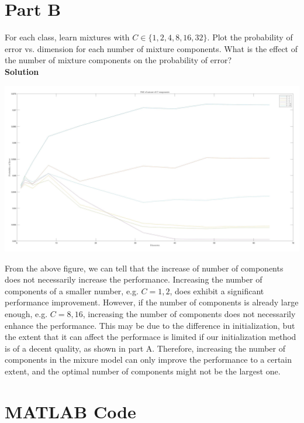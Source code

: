 \documentclass{article}
\begin{document}
\section*{Part B}

For each class, learn mixtures with $C \in \{1, 2, 4, 8, 16, 32\}$. 
Plot the probability of error vs. dimension for each number of mixture components. 
What is the effect of the number of mixture components on the probability of error?
\\

\textbf{\large Solution}
\\

\begin{center}
    \includegraphics[width=\textwidth]{partB}
\end{center}
From the above figure, we can tell that the increase of number of components does not necessarily increase the performance.
Increasing the number of components of a smaller number, e.g. $C = 1, 2$, does exhibit a significant performance improvement.
However, if the number of components is already large enough, e.g. $C = 8, 16$, increasing the number of components does not necessarily enhance the performance.
This may be due to the difference in initialization, but the extent that it can affect the performace is limited if our initialization method is of a decent quality, as shown in part A.
Therefore, increasing the number of components in the mixure model can only improve the performance to a certain extent, and the optimal number of components might not be the largest one.

\pagebreak

\section*{MATLAB Code}
\end{document}
